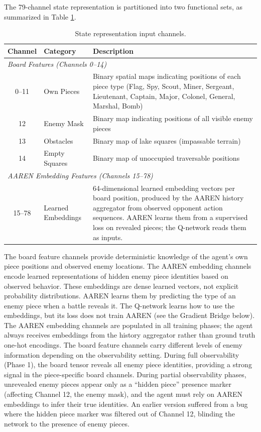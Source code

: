 The 79-channel state representation is partitioned into two functional sets, as summarized in Table \ref{tab:state_channels}.

\begin{table}[h]
\centering
\caption{State representation input channels.}
\label{tab:state_channels}
\begin{tabular}{clp{8cm}}
\hline
\textbf{Channel} & \textbf{Category} & \textbf{Description} \\
\hline
\multicolumn{3}{l}{\textit{Board Features (Channels 0--14)}} \\
0--11 & Own Pieces & Binary spatial maps indicating positions of each piece type (Flag, Spy, Scout, Miner, Sergeant, Lieutenant, Captain, Major, Colonel, General, Marshal, Bomb) \\
12 & Enemy Mask & Binary map indicating positions of all visible enemy pieces \\
13 & Obstacles & Binary map of lake squares (impassable terrain) \\
14 & Empty Squares & Binary map of unoccupied traversable positions \\
\hline
\multicolumn{3}{l}{\textit{AAREN Embedding Features (Channels 15--78)}} \\
15--78 & Learned Embeddings & 64-dimensional learned embedding vectors per board position, produced by the AAREN history aggregator from observed opponent action sequences. AAREN learns them from a supervised loss on revealed pieces; the Q-network reads them as inputs. \\
\hline
\end{tabular}
\end{table}

The board feature channels provide deterministic knowledge of the agent's own piece positions and observed enemy locations. The AAREN embedding channels encode learned representations of hidden enemy piece identities based on observed behavior. These embeddings are dense learned vectors, not explicit probability distributions. AAREN learns them by predicting the type of an enemy piece when a battle reveals it. The Q-network learns how to use the embeddings, but its loss does not train AAREN (see the Gradient Bridge below). The AAREN embedding channels are populated in all training phases; the agent always receives embeddings from the history aggregator rather than ground truth one-hot encodings. The board feature channels carry different levels of enemy information depending on the observability setting. During full observability (Phase 1), the board tensor reveals all enemy piece identities, providing a strong signal in the piece-specific board channels. During partial observability phases, unrevealed enemy pieces appear only as a ``hidden piece'' presence marker (affecting Channel 12, the enemy mask), and the agent must rely on AAREN embeddings to infer their true identities. An earlier version suffered from a bug where the hidden piece marker was filtered out of Channel 12, blinding the network to the presence of enemy pieces. 
